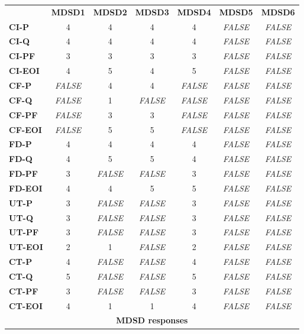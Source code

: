 \documentclass[final_report_innit.tex]{subfiles}
\begin{document}
\begin{center}
\begin{tabular}[b]{l | c | c | c | c | c | c}
	& \textbf{MDSD1} & \textbf{MDSD2} & \textbf{MDSD3} & \textbf{MDSD4} & \textbf{MDSD5} & \textbf{MDSD6} \\ %
	\textbf{CI-P} & 4 & 4 & 4 & 4 & \textit{FALSE} & \textit{FALSE} \\ %
	\textbf{CI-Q} & 4 & 4 & 4 & 4 & \textit{FALSE} & \textit{FALSE} \\ %
	\textbf{CI-PF} & 3 & 3 & 3 & 3 & \textit{FALSE} & \textit{FALSE} \\ %
	\textbf{CI-EOI} & 4 & 5 & 4 & 5 & \textit{FALSE} & \textit{FALSE} \\ %
	\textbf{CF-P} & \textit{FALSE} & 4 & 4 & \textit{FALSE} & \textit{FALSE} & \textit{FALSE} \\ %
	\textbf{CF-Q} & \textit{FALSE} & 1 & \textit{FALSE} & \textit{FALSE} & \textit{FALSE} & \textit{FALSE} \\ %
	\textbf{CF-PF} & \textit{FALSE} & 3 & 3 & \textit{FALSE} & \textit{FALSE} & \textit{FALSE} \\ %
	\textbf{CF-EOI} & \textit{FALSE} & 5 & 5 & \textit{FALSE} & \textit{FALSE} & \textit{FALSE} \\ %
	\textbf{FD-P} & 4 & 4 & 4 & 4 & \textit{FALSE} & \textit{FALSE} \\ %
	\textbf{FD-Q} & 4 & 5 & 5 & 4 & \textit{FALSE} & \textit{FALSE} \\ %
	\textbf{FD-PF} & 3 & \textit{FALSE} & \textit{FALSE} & 3 & \textit{FALSE} & \textit{FALSE} \\ %
	\textbf{FD-EOI} & 4 & 4 & 5 & 5 & \textit{FALSE} & \textit{FALSE} \\ %
	\textbf{UT-P} & 3 & \textit{FALSE} & \textit{FALSE} & 3 & \textit{FALSE} & \textit{FALSE} \\ %
	\textbf{UT-Q} & 3 & \textit{FALSE} & \textit{FALSE} & 3 & \textit{FALSE} & \textit{FALSE} \\ %
	\textbf{UT-PF} & 3 & \textit{FALSE} & \textit{FALSE} & 3 & \textit{FALSE} & \textit{FALSE} \\ %
	\textbf{UT-EOI} & 2 & 1 & \textit{FALSE} & 2 & \textit{FALSE} & \textit{FALSE} \\ %
	\textbf{CT-P} & 4 & \textit{FALSE} & \textit{FALSE} & 4 & \textit{FALSE} & \textit{FALSE} \\ %
	\textbf{CT-Q} & 5 & \textit{FALSE} & \textit{FALSE} & 5 & \textit{FALSE} & \textit{FALSE} \\ %
	\textbf{CT-PF} & 3 & \textit{FALSE} & \textit{FALSE} & 3 & \textit{FALSE} & \textit{FALSE} \\ %
	\textbf{CT-EOI} & 4 & 1 & 1 & 4 & \textit{FALSE} & \textit{FALSE} \\ %
	\multicolumn{7}{c}{\cellcolor{white} \textbf{MDSD responses}} \\
\end{tabular}
\end{center}
\end{document}
